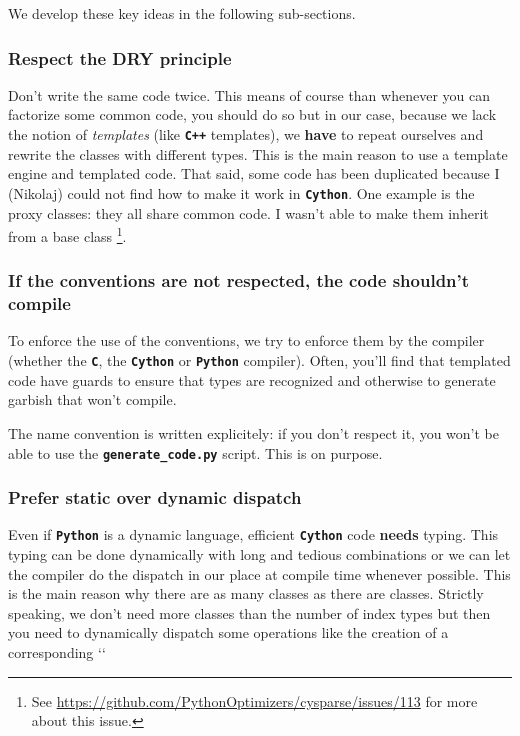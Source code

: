 \documentclass[letterpaper,10pt,english]{sphinxmanual}
\begin{document}
We develop these key ideas in the following sub-sections.


\subsubsection{Respect the DRY principle}
\label{cysparse_lib_mainteners:respect-the-dry-principle}
Don't write the same code twice. This means of course than whenever you can factorize some common code, you should do so but in our case, because we lack the notion of \emph{templates} (like \textbf{\texttt{C++}} templates), we
\textbf{have} to repeat ourselves and rewrite the classes with different types. This is the main reason to use a template engine and templated code. That said, some code has been duplicated because I (Nikolaj) could not find
how to make it work in \textbf{\texttt{Cython}}. One example is the proxy classes: they all share common code. I wasn't able to make them inherit from a base class \footnote{
See \href{https://github.com/PythonOptimizers/cysparse/issues/113}{https://github.com/PythonOptimizers/cysparse/issues/113} for more about this issue.
}.


\subsubsection{If the conventions are not respected, the code shouldn't compile}
\label{cysparse_lib_mainteners:if-the-conventions-are-not-respected-the-code-shouldn-t-compile}
To enforce the use of the conventions, we try to enforce them by the compiler (whether the \textbf{\texttt{C}}, the \textbf{\texttt{Cython}} or \textbf{\texttt{Python}} compiler). Often, you'll find that templated code have guards to ensure that
types are recognized and otherwise to generate garbish that won't compile.

The name convention is written explicitely: if you don't respect it, you won't be able to use the \textbf{\texttt{generate\_code.py}} script. This is on purpose.


\subsubsection{Prefer static over dynamic dispatch}
\label{cysparse_lib_mainteners:prefer-static-over-dynamic-dispatch}
Even if \textbf{\texttt{Python}} is a dynamic language, efficient \textbf{\texttt{Cython}} code \textbf{needs} typing. This typing can be done dynamically with long and tedious  combinations or we can let the compiler
do the dispatch in our place at compile time whenever possible. This is the main reason why there are as many  classes as there are  classes. Strictly speaking, we don't need
more  classes than the number of index types but then you need to dynamically dispatch some operations like the creation of a corresponding {}`{}`
\end{document}
